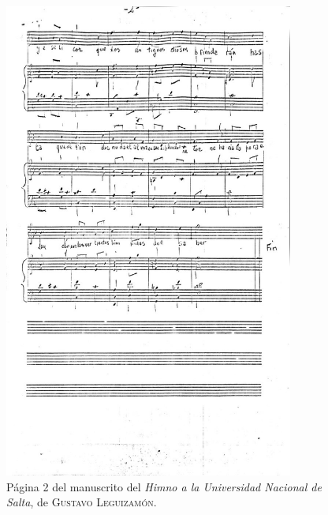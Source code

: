 \begin{figure}[H]
\centering
\includegraphics[width=0.85\textwidth]{img/partitura-2}
\caption{Página 2 del manuscrito del \emph{Himno a la Universidad Nacional de Salta}, de \textsc{Gustavo Leguizamón}.}
\label{fig:partitura-2}
\end{figure}

